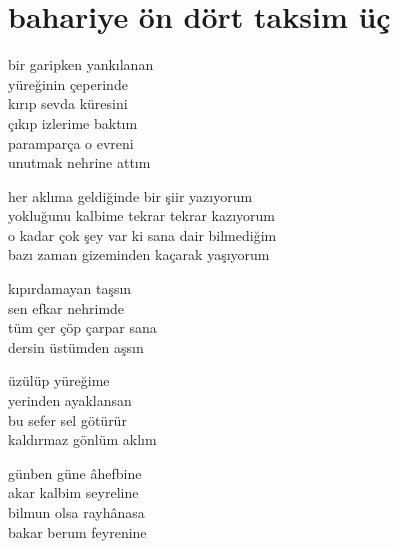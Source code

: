\documentclass[10pt, openright, oneside]{memoir}
\theoremstyle{definition}
\begin{document}
\chapter{bahariye ön dört taksim üç}
\vspace*{\fill}
\settowidth{\versewidth}{bir garipken yankılanan}
\begin{cverse}
  bir garipken yankılanan \\
  yüreğinin çeperinde \\
  kırıp sevda küresini \\
  çıkıp izlerime baktım \\
  paramparça o evreni \\
  unutmak nehrine attım
\end{cverse}
\vspace*{\fill}
%
\newpage
{}
\vspace*{\fill}
\settowidth{\versewidth}{o kadar çok şey var ki sana dair bilmediğim}
\begin{cverse}
  her aklıma geldiğinde bir şiir yazıyorum \\
  yokluğunu kalbime tekrar tekrar kazıyorum \\
  o kadar çok şey var ki sana dair bilmediğim \\
  bazı zaman gizeminden kaçarak yaşıyorum
\end{cverse}
\vspace*{\fill}
%
\newpage
{}
\vspace*{\fill}
\settowidth{\versewidth}{tüm çer çöp çarpar sana}
\begin{cverse}
  kıpırdamayan taşsın \\
  sen efkar nehrimde \\
  tüm çer çöp çarpar sana \\
  dersin üstümden aşsın

  üzülüp yüreğime \\
  yerinden ayaklansan \\
  bu sefer sel götürür \\
  kaldırmaz gönlüm aklım
\end{cverse}
\vspace*{\fill}
%
\newpage
{}
\vspace*{\fill}
\settowidth{\versewidth}{akar kalbim seyreline}
\begin{cverse}
  günben güne âhefbine \\
  akar kalbim seyreline \\
  bilmun olsa rayhânasa \\
  bakar berum feyrenine
\end{cverse}
\end{document}

